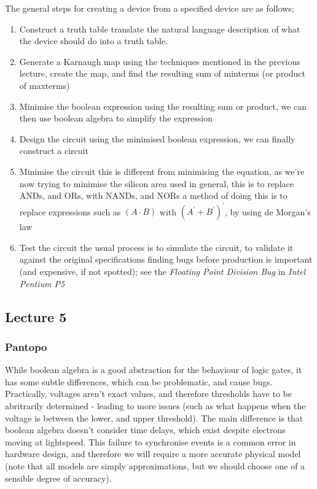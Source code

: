 \documentclass[a4paper, 12pt]{article}
\begin{document}
                The general steps for creating a device from a specified device are as follows;
                \begin{enumerate}[1.]
                    \itemsep0em
                    \item Construct a truth table
                        \subitem translate the natural language description of what the device should do into a truth table.
                    \item Generate a Karnaugh map
                        \subitem using the techniques mentioned in the previous lecture, create the map, and find the resulting sum of minterms (or product of maxterms)
                    \item Minimise the boolean expression
                        \subitem using the resulting sum or product, we can then use boolean algebra to simplify the expression
                    \item Design the circuit
                        \subitem using the minimised boolean expression, we can finally construct a circuit
                    \item Minimise the circuit
                        \subitem this is different from minimising the equation, as we're now trying to minimise the silicon area used
                        \subitem in general, this is to replace ANDs, and ORs, with NANDs, and NORs
                        \subitem a method of doing this is to replace expressions such as $(A \cdot B)$ with $(A^\prime + B^\prime)^\prime$, by using de Morgan's law
                    \item Test the circuit
                        \subitem the usual process is to simulate the circuit, to validate it against the original specifications
                        \subitem finding bugs before production is important (and expensive, if not spotted); see the \textit{Floating Point Division Bug} in \textit{Intel Pentium P5}
                \end{enumerate}
        \subsection*{Lecture 5}
            \subsubsection*{Pantopo}
                While boolean algebra is a good abstraction for the behaviour of logic gates, it has some subtle differences, which can be problematic, and cause bugs. Practically, voltages aren't exact values, and therefore thresholds have to be abritrarily determined - leading to more issues (such as what happens when the voltage is between the lower, and upper threshold). The main difference is that boolean algebra doesn't consider time delays, which exist despite electrons moving at lightspeed. This failure to synchronise events is a common error in hardware design, and therefore we will require a more accurate physical model (note that all models are simply approximations, but we should choose one of a sensible degree of accuracy).
                \medskip
\end{document}
